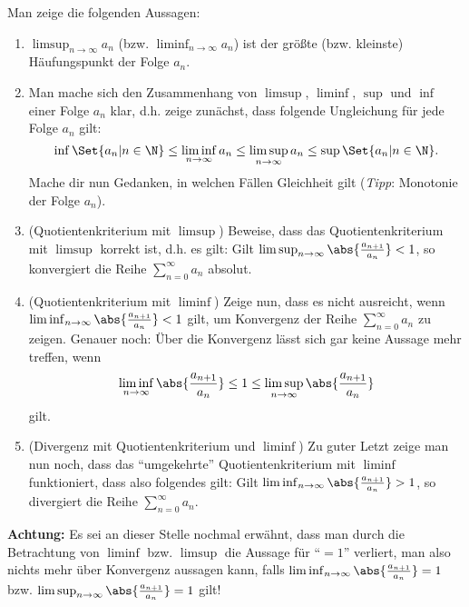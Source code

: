 \begin{exercise}
  Man zeige die folgenden Aussagen:
  \begin{enumerate}[label=(\alph*)]
  \item $\limsup_{n \to \infty} a_n$ (bzw. $\liminf_{n \to \infty} a_n$) ist der
    größte (bzw. kleinste) Häufungspunkt der Folge $a_n$.

  \item Man mache sich den Zusammenhang von $\limsup$, $\liminf$, $\sup$ und
    $\inf$ einer Folge $a_n$ klar, d.h. zeige zunächst, dass folgende
    Ungleichung für jede Folge $a_n$ gilt:
    \begin{equation*}
      \inf \Set{a_n | n \in \N}
      \leq
      \liminf_{n \to \infty} a_n
      \leq
      \limsup_{n \to \infty} a_n
      \leq
      \sup \Set{a_n | n \in \N}.
    \end{equation*}
    Mache dir nun Gedanken, in welchen Fällen Gleichheit gilt (\emph{Tipp}:
    Monotonie der Folge $a_n$).

  \item (Quotientenkriterium mit $\limsup$) Beweise, dass das
    Quotientenkriterium mit $\limsup$ korrekt ist, d.h. es gilt: Gilt
    $\limsup_{n \to \infty} \abs{\frac{a_{n+1}}{a_n}} < 1$, so konvergiert die
    Reihe $\displaystyle \sum_{n=0}^{\infty}a_n$ absolut.

  \item (Quotientenkriterium mit $\liminf$) Zeige nun, dass es nicht ausreicht,
    wenn $\liminf_{n \to \infty} \abs{\frac{a_{n+1}}{a_n}} < 1$ gilt, um
    Konvergenz der Reihe $\displaystyle \sum_{n=0}^{\infty}a_n$ zu zeigen.
    Genauer noch: Über die Konvergenz lässt sich gar keine Aussage mehr treffen,
    wenn
    \begin{equation*}
      \liminf_{n \to \infty} \abs{\frac{a_{n+1}}{a_n}}
      \leq
      1
      \leq
      \limsup_{n \to \infty} \abs{\frac{a_{n+1}}{a_n}}
    \end{equation*}
    gilt.

  \item(Divergenz mit Quotientenkriterium und $\liminf$) Zu guter Letzt zeige
    man nun noch, dass das \enquote{umgekehrte} Quotientenkriterium mit
    $\liminf$ funktioniert, dass also folgendes gilt: Gilt
    $\liminf_{n \to \infty} \abs{\frac{a_{n+1}}{a_n}} > 1$, so divergiert die Reihe
    $\displaystyle \sum_{n=0}^{\infty}a_n$.
  \end{enumerate}
  \textbf{Achtung:} Es sei an dieser Stelle nochmal erwähnt, dass man durch die
  Betrachtung von $\liminf$ bzw. $\limsup$ die Aussage für \enquote{$=1$}
  verliert, man also nichts mehr über Konvergenz aussagen kann, falls
  $\liminf_{n \to \infty} \abs{\frac{a_{n+1}}{a_n}} = 1$ bzw.
  $\limsup_{n \to \infty} \abs{\frac{a_{n+1}}{a_n}} = 1$ gilt!
\end{exercise}


